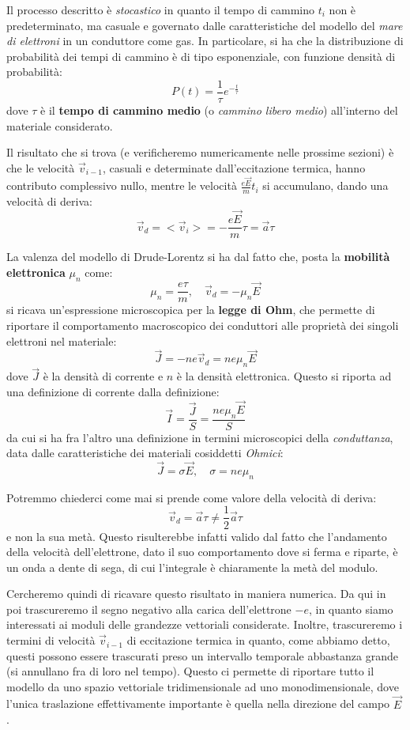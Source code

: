 \documentclass[a4paper,11pt]{article}
\begin{document}
Il processo descritto è \textit{stocastico} in quanto il tempo di cammino $t_i$ non è predeterminato, ma casuale e governato dalle caratteristiche del modello del \textit{mare di elettroni} in un conduttore come gas. In particolare, si ha che la distribuzione di probabilità dei tempi di cammino è di tipo esponenziale, con funzione densità di probabilità:
$$
P(t) = \frac{1}{\tau} e^{-\frac{t}{\tau}}
$$
dove $\tau$ è il \textbf{tempo di cammino medio} (o \textit{cammino libero medio}) all'interno del materiale considerato.

Il risultato che si trova (e verificheremo numericamente nelle prossime sezioni) è che le velocità $\vec{v}_{i - 1}$, casuali e determinate dall'eccitazione termica, hanno contributo complessivo nullo, mentre le velocità $\frac{e \vec{E}}{m} t_i$ si accumulano, dando una velocità di deriva:
$$
\vec{v}_d = < \vec{v}_i > = -\frac{e \vec{E}}{m} \tau = \vec{a} \tau
$$

La valenza del modello di Drude-Lorentz si ha dal fatto che, posta la \textbf{mobilità elettronica} $\mu_n$ come:
$$
\mu_n = \frac{e \tau}{m}, \quad \vec{v}_d = -\mu_n \vec{E}
$$
si ricava un'espressione microscopica per la \textbf{legge di Ohm}, che permette di riportare il comportamento macroscopico dei conduttori alle proprietà dei singoli elettroni nel materiale:
$$
\vec{J} = -n e \vec{v}_d = n e \mu_n \vec{E}
$$
dove $\vec{J}$ è la densità di corrente e $n$ è la densità elettronica. Questo si riporta ad una definizione di corrente dalla definizione:
$$
\vec{I} = \frac{\vec{J}}{S} = \frac{n e \mu_n \vec{E}}{S}
$$
da cui si ha fra l'altro una definizione in termini microscopici della \textit{conduttanza}, data dalle caratteristiche dei materiali cosiddetti \textit{Ohmici}:
$$
\vec{J} = \sigma \vec{E}, \quad \sigma = n e \mu_n
$$

Potremmo chiederci come mai si prende come valore della velocità di deriva:
$$
\vec{v}_d = \vec{a} \tau \neq \frac{1}{2} \vec{a} \tau
$$
e non la sua metà. Questo risulterebbe infatti valido dal fatto che l'andamento della velocità dell'elettrone, dato il suo comportamento dove si ferma e riparte, è un onda a dente di sega, di cui l'integrale è chiaramente la metà del modulo. 

Cercheremo quindi di ricavare questo risultato in maniera numerica. Da qui in poi trascureremo il segno negativo alla carica dell'elettrone $-e$, in quanto siamo interessati ai moduli delle grandezze vettoriali considerate. Inoltre, trascureremo i termini di velocità $\vec{v}_{i - 1}$ di eccitazione termica in quanto, come abbiamo detto, questi possono essere trascurati preso un intervallo temporale abbastanza grande (si annullano fra di loro nel tempo). Questo ci permette di riportare tutto il modello da uno spazio vettoriale tridimensionale ad uno monodimensionale, dove l'unica traslazione effettivamente importante è quella nella direzione del campo $\vec{E}$.
\end{document}
